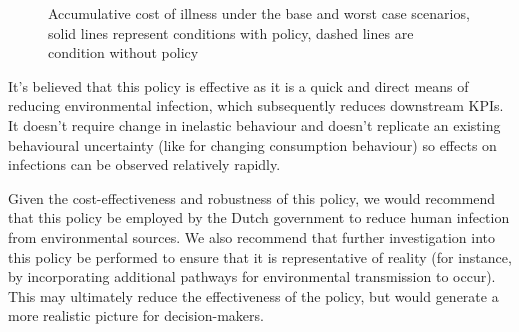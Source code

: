 \begin{figure}[h!]
\begin{minipage}{0.45\textwidth}
        \caption{Accumulative cost of illness under the base and worst case scenarios, solid lines represent conditions with policy, dashed lines are condition without policy}
        \label{fig:ec_bwc_acoi}
    \end{minipage}
\end{figure}

It's believed that this policy is effective as it is a quick and direct means of reducing environmental infection, which subsequently reduces downstream KPIs. It doesn't require change in inelastic behaviour and doesn't replicate an existing behavioural uncertainty (like for changing consumption behaviour) so effects on infections can be observed relatively rapidly.

Given the cost-effectiveness and robustness of this policy, we would recommend that this policy be employed by the Dutch government to reduce human infection from environmental sources. We also recommend that further investigation into this policy be performed to ensure that it is representative of reality (for instance, by incorporating additional pathways for environmental transmission to occur). This may ultimately reduce the effectiveness of the policy, but would generate a more realistic picture for decision-makers.

